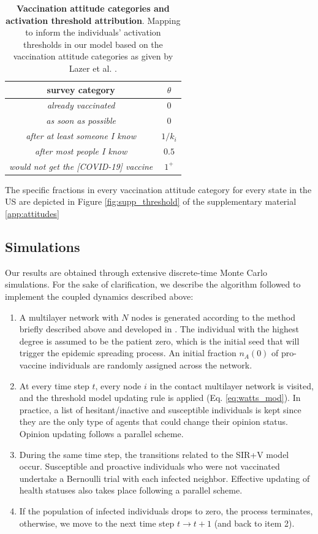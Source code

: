 \documentclass[
 reprint,
 amsmath,amssymb,
 aps,
]{revtex4-2}
\begin{document}
\begin{table}[!ht]
\centering
\begin{tabular}{cc}
\hline
\textbf{survey category} & $\theta$ \\
\hline
\textit{already vaccinated} & $0$ \\
\textit{as soon as possible} & $0$ \\
\textit{after at least someone I know} & $1/k_i$ \\
\textit{after most people I know} & $0.5$ \\
\textit{would not get the [COVID-19] vaccine} & $1^+$ \\
\hline
\end{tabular}
\caption[Vaccination attitude categories and activation threshold attribution]{\textbf{Vaccination attitude categories and activation threshold attribution}. Mapping to inform the individuals' activation thresholds in our model based on the vaccination attitude categories as given by Lazer et al. \cite{lazer2021covid}.}
\label{tab:thresholds}
\end{table}

The specific fractions in every vaccination attitude category for every state in the US are depicted in Figure \ref{fig:supp_threshold} of the supplementary material \ref{app:attitudes}

\subsection{Simulations}
\label{subsec:simulations}

Our results are obtained through extensive discrete-time Monte Carlo simulations. For the sake of clarification, we describe the algorithm followed to implement the coupled dynamics described above:
\begin{enumerate}
    \item A multilayer network with $N$ nodes is generated according to the method briefly described above and developed in \cite{aleta2020data}. The individual with the highest degree is assumed to be the patient zero, which is the initial seed that will trigger the epidemic spreading process. An initial fraction $n_A(0)$ of pro-vaccine individuals are randomly assigned across the network. 
    \item At every time step $t$, every node $i$ in the contact multilayer network is visited, and the threshold model updating rule is applied (Eq. \ref{eq:watts_mod}). In practice, a list of hesitant/inactive and susceptible individuals is kept since they are the only type of agents that could change their opinion status. Opinion updating follows a parallel scheme.
    \item During the same time step, the transitions related to the SIR+V model occur. Susceptible and proactive individuals who were not vaccinated undertake a Bernoulli trial with each infected neighbor. Effective updating of health statuses also takes place following a parallel scheme.
    \item If the population of infected individuals drops to zero, the process terminates, otherwise, we move to the next time step $t\to t+1$ (and back to item 2).
\end{enumerate}
\end{document}
